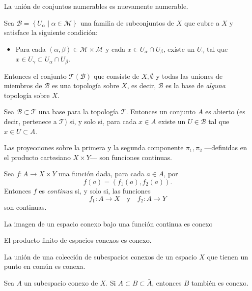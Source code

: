 \documentclass[a5paper,10pt,final]{extarticle}
\begin{document}
\begin{teo}\label{teo:unionConNum}
	La unión de conjuntos numerables es nuevamente numerable.
\end{teo}

\begin{teo}\label{base1}
	Sea $\mathcal{B}=\left\{ U_\alpha \mid \alpha\in \mathscr{M} \right\}$ una familia de subconjuntos de $X$
	que cubre a $X$ y satisface la siguiente condición:
	\begin{itemize}
		\item 	Para cada $(\alpha,\beta)\in\mathscr{M}\times\mathscr{M}$ y cada $x\in U_\alpha\cap U_\beta$,
		existe un $U_\gamma$ tal que $x\in U_\gamma\subset U_\alpha\cap U_\beta$.
	\end{itemize}
	
	Entonces el conjunto $\mathcal{T}(\mathcal{B})$ que consiste de $X,\emptyset$ y todas las uniones de miembros
	de $\mathcal{B}$ es una topología sobre $X$, es decir, $\mathcal{B}$ es la base de \emph{alguna}
	topología sobre $X$.
\end{teo}

\begin{teo}\label{base2}
	Sea $\mathcal{B}\subset\mathcal{T}$ una base para la topología $\mathcal{T}$. Entonces un conjunto $A$
	es abierto (es decir, pertenece a $\mathcal{T}$) si, y solo si, para cada $x\in A$ existe un
	$U\in\mathcal{B}$ tal que $x\in U\subset A$.
\end{teo}

\begin{teo}\label{cont:funccoord}
	Las proyecciones sobre la primera y la segunda componente $\pi_1,\pi_2$ ---definidas en el producto cartesiano $X\times Y$--- son funciones continuas.	
\end{teo}

\begin{teo}\label{cont:proy}
	Sea $f:A\to X\times Y$ una función dada, para cada $a\in A$, por
	\[
	f(a)=(f_1(a),f_2(a)).
	\]
	Entonces $f$ es \emph{continua} si, y solo si, las funciones
	\[
	f_1:A\to X\quad\text{y}\quad f_2:A\to Y 
	\]
	son continuas. 
\end{teo}

\begin{teo}\label{conex:contfunct}
	La imagen de un espacio conexo bajo una función continua es conexo
\end{teo}

\begin{teo}\label{conex:prod}
	El producto finito de espacios conexos es conexo.
\end{teo}

\begin{teo}\label{conex:union}
	La unión de una colección de subespacios conexos de un espacio $X$ que tienen un
	punto en común es conexa.
\end{teo}

\begin{teo}\label{conex:cerrad}
	Sea $A$ un subespacio conexo de $X$. Si $A\subset B\subset\bar A$, entonces $B$
	también es conexo.
\end{teo}

\printbibliography[
heading=bibintoc,
title={Referencias bibliográficas}
]
\end{document}
